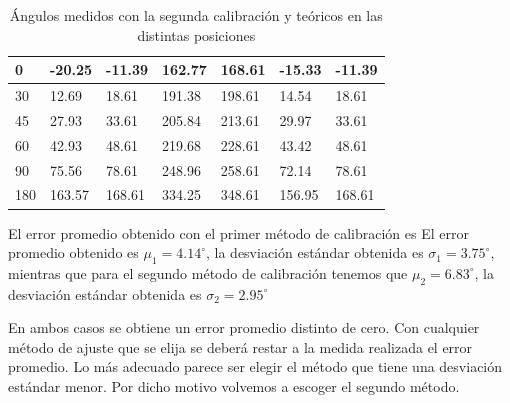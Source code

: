 \documentclass[spanish,12pt,a4paper,titlepage]{report}
\begin{document}
\begin{table}
\begin{tabular}{|p{50pt}|p{50pt}|p{50pt}|p{50pt}|p{51pt}|p{50pt}|p{50pt}|}
 0    &    -20.25  & -11.39& 162.77& 168.61&-15.33 & -11.39\\ \hline
 30   &   12.69    & 18.61& 191.38& 198.61&14.54 & 18.61 \\ \hline
 45   &   27.93 	  &	33.61 & 205.84 & 213.61 & 29.97 & 33.61 \\ \hline
 60   &   42.93 	  & 48.61 & 219.68 & 228.61 & 43.42 & 48.61 \\ \hline
 90   &   75.56 	  & 78.61 & 248.96 & 258.61 & 72.14 & 78.61 \\ \hline
 180  &   163.57	  &	168.61& 334.25 & 348.61 & 156.95 & 168.61 \\ \hline
 
\end{tabular}
\caption{Ángulos medidos con la segunda calibración y teóricos en las distintas posiciones}
\label{tab:angulos}
\end{table} 


El error promedio obtenido con el primer método de calibración es 
El error promedio obtenido es $\mu_1=4.14^\circ$, la desviación estándar obtenida es $\sigma_1
=3.75^\circ$, mientras que para el segundo método de calibración tenemos que $\mu_2=6.83^\circ$, la desviación estándar obtenida es $\sigma_2
=2.95^\circ$

En ambos casos se obtiene un error promedio distinto de cero. Con cualquier método de ajuste que se elija se deberá restar a la medida realizada el error promedio. Lo más adecuado parece ser elegir el método que tiene una desviación estándar menor. Por dicho motivo volvemos a escoger el segundo método. 
\end{document}
